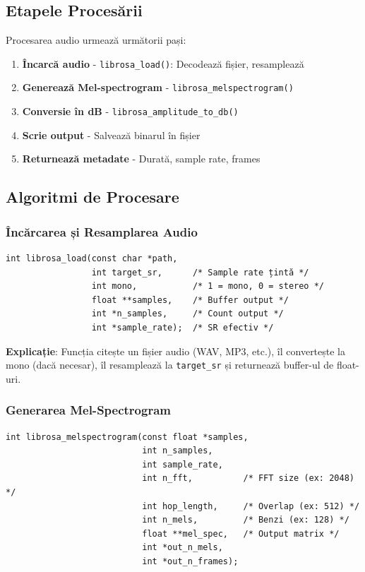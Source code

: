 \documentclass[12pt,a4paper,oneside]{book}
\begin{document}
\subsection{Etapele Procesării}

Procesarea audio urmează următorii pași:

\begin{enumerate}
    \item \textbf{Încarcă audio} - \texttt{librosa\_load()}: Decodează fișier, resamplează
    \item \textbf{Generează Mel-spectrogram} - \texttt{librosa\_melspectrogram()}
    \item \textbf{Conversie în dB} - \texttt{librosa\_amplitude\_to\_db()}
    \item \textbf{Scrie output} - Salvează binarul în fișier
    \item \textbf{Returnează metadate} - Durată, sample rate, frames
\end{enumerate}

\subsection{Algoritmi de Procesare}

\subsubsection{Încărcarea și Resamplarea Audio}

\begin{lstlisting}
int librosa_load(const char *path,
                 int target_sr,      /* Sample rate țintă */
                 int mono,           /* 1 = mono, 0 = stereo */
                 float **samples,    /* Buffer output */
                 int *n_samples,     /* Count output */
                 int *sample_rate);  /* SR efectiv */
\end{lstlisting}

\textbf{Explicație}: Funcția citește un fișier audio (WAV, MP3, etc.), îl convertește la mono (dacă necesar), îl resamplează la \texttt{target\_sr} și returnează buffer-ul de float-uri.

\subsubsection{Generarea Mel-Spectrogram}

\begin{lstlisting}
int librosa_melspectrogram(const float *samples,
                           int n_samples,
                           int sample_rate,
                           int n_fft,          /* FFT size (ex: 2048) */
                           int hop_length,     /* Overlap (ex: 512) */
                           int n_mels,         /* Benzi (ex: 128) */
                           float **mel_spec,   /* Output matrix */
                           int *out_n_mels,
                           int *out_n_frames);
\end{lstlisting}
\end{document}
